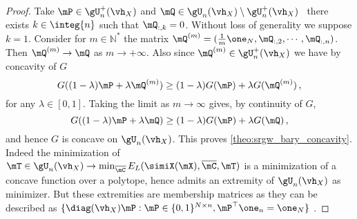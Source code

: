 \begin{proof}
	
	Take $\mP \in \gU^{+}_n(\vh_X)$ and $\mQ \in \gU_n(\vh_X)\setminus\gU^{+}_n(\vh_X)$ \ie\ there exists $k \in \integ{n}$ such that $\mQ_{:,k} = 0$. Without loss of generality we suppose $k=1$. Consider for $m \in \mathbb{N}^{*}$ the matrix $\mQ^{(m)} = (\frac{1}{m} \one_{N}, \mQ_{:,2}, \cdots, \mQ_{:,n})$. Then $\mQ^{(m)} \to \mQ$ as $m \to +\infty$. Also since $\mQ^{(m)} \in \gU^{+}_n(\vh_X)$ we have by concavity of $G$
	\begin{equation}
		G((1-\lambda) \mP + \lambda \mQ^{(m)}) \geq (1-\lambda) G(\mP) + \lambda G(\mQ^{(m)})\,,
	\end{equation}
	for any $\lambda \in [0,1]$. Taking the limit as $m \to \infty$ gives, by continuity of $G$,
	\begin{equation}
		G((1-\lambda) \mP + \lambda \mQ) \geq (1-\lambda) G(\mP) + \lambda G(\mQ)\,,
	\end{equation}
	and hence $G$ is concave on $\gU_n(\vh_X)$. This proves \cref{theo:srgw_bary_concavity}. Indeed the minimization of $\mT \in \gU_n(\vh_X) \to \min_{\overline{\mC}} E_{L}(\simiX(\mX), \overline{\mC}, \mT)$ is a minimization of a concave function over a polytope, hence admits an extremity of $\gU_n(\vh_X)$ as minimizer. But these extremities are membership matrices as they can be described as $\{\diag(\vh_X) \mP: \mP \in \{0,1\}^{N \times n}, \mP^\top \one_n = \one_N\}$ \cite{cao2022centrosymmetric}.
\end{proof}






